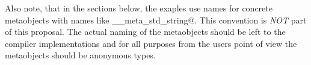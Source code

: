Also note, that in the sections below, the exaples use names for concrete
metaobjects with names like \verb@__meta_std_string@. This convention
is {\em NOT} part of this proposal. The actual naming of the metaobjects
should be left to the compiler implementations and for all purposes
from the users point of view the metaobjects should be anonymous types.













